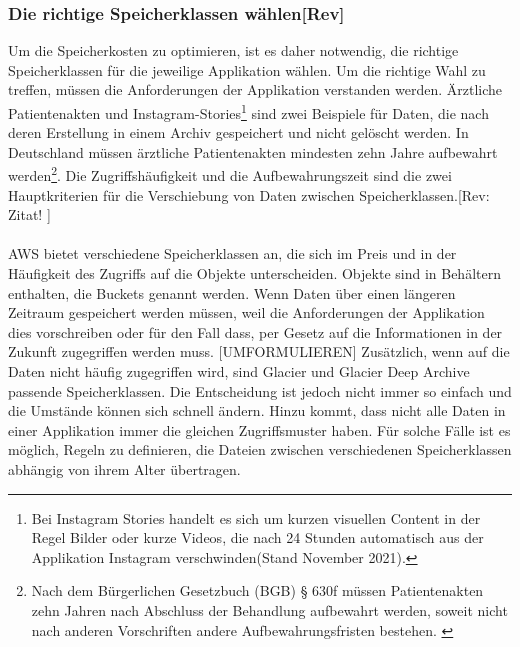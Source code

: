 \subsubsection{Die richtige Speicherklassen wählen[Rev]}
Um die Speicherkosten zu optimieren, ist es daher notwendig, die richtige Speicherklassen für die jeweilige Applikation wählen. Um die richtige Wahl zu treffen, müssen die Anforderungen der Applikation verstanden werden. Ärztliche Patientenakten und Instagram-Stories\footnote{Bei Instagram Stories handelt es sich um kurzen visuellen Content in der Regel Bilder oder kurze Videos, die nach 24 Stunden automatisch aus der Applikation Instagram verschwinden(Stand November 2021).\cite{IG2}} sind zwei Beispiele für Daten, die nach deren Erstellung in einem Archiv gespeichert und nicht gelöscht werden. In Deutschland müssen ärztliche Patientenakten mindesten zehn Jahre aufbewahrt werden\footnote{Nach dem Bürgerlichen Gesetzbuch (BGB) § 630f müssen Patientenakten zehn Jahren nach Abschluss der Behandlung aufbewahrt werden, soweit nicht nach anderen Vorschriften andere Aufbewahrungsfristen bestehen. \cite{BGB}}. %
Die Zugriffshäufigkeit und die Aufbewahrungszeit sind die zwei Hauptkriterien für die Verschiebung von Daten zwischen Speicherklassen.[Rev: Zitat! ]
\\\\
AWS bietet verschiedene Speicherklassen an, die sich im Preis und in der Häufigkeit des Zugriffs auf die Objekte unterscheiden. Objekte sind in Behältern enthalten, die Buckets genannt werden. Wenn Daten über einen längeren Zeitraum gespeichert werden müssen, weil die Anforderungen der Applikation dies vorschreiben oder für den Fall dass, per Gesetz auf die Informationen in der Zukunft zugegriffen werden muss.
[UMFORMULIEREN]
Zusätzlich, wenn auf die Daten nicht häufig zugegriffen wird, sind Glacier und Glacier Deep Archive passende Speicherklassen. Die Entscheidung ist jedoch nicht immer so einfach und die Umstände können sich schnell ändern. Hinzu kommt, dass nicht alle Daten in einer Applikation immer die gleichen Zugriffsmuster haben. Für solche Fälle ist es möglich, Regeln zu definieren, die Dateien zwischen verschiedenen Speicherklassen abhängig von ihrem Alter übertragen.

